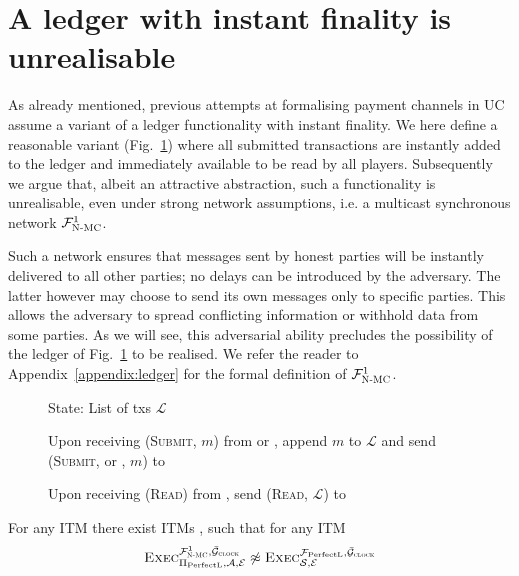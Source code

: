 \section{A ledger with instant finality is unrealisable}
\label{sec:perfect-ledger}
  As already mentioned, previous attempts at formalising payment channels in
  UC~\cite{DBLP:conf/ccs/DziembowskiFH18,perun,Malavolta:2017:CPP:3133956.3134096,sprites}
  assume a variant of a ledger functionality with instant finality. We here
  define a reasonable variant \perfectledger{}
  (Fig.~\ref{fig:perfectledger:func}) where all submitted transactions are
  instantly added to the ledger and immediately available to be read by all
  players. Subsequently we argue that, albeit an attractive abstraction, such a
  functionality is unrealisable, even under strong network assumptions, i.e. a
  multicast synchronous network $\mathcal{F}_{\textsc{N-MC}}^1$.

  Such a network ensures that messages sent by honest parties will be instantly
  delivered to all other parties; no delays can be introduced by the adversary.
  The latter however may choose to send its own messages only to specific
  parties. This allows the adversary to spread conflicting information or
  withhold data from some parties. As we will see, this adversarial ability
  precludes the possibility of the ledger of Fig.~\ref{fig:perfectledger:func}
  to be realised. We refer the reader to Appendix~\ref{appendix:ledger} for the
  formal definition of $\mathcal{F}_{\textsc{N-MC}}^1$.

  \begin{figure}[H]
    \begin{systembox}{\perfectledger}
      \begin{algorithmic}[1]
        \State State: List of txs $\mathcal{L}$
        \Statex

        \State Upon receiving (\textsc{Submit}, $m$) from \alice or \adversary,
        append $m$ to $\mathcal{L}$ and send (\textsc{Submit}, \alice or
        \adversary, $m$) to \adversary
        \Statex

        \State Upon receiving (\textsc{Read}) from \alice, send (\textsc{Read},
        $\mathcal{L}$) to \alice
      \end{algorithmic}
    \end{systembox}
    \caption{}
    \label{fig:perfectledger:func}
  \end{figure}

  \begin{theorem}
    \label{theorem:perfectledger}
    For any ITM \perfectprot{} there exist ITMs \perfectenv,
    \perfectadv{} such that for any ITM \simulator
    \begin{equation*}
      \textsc{Exec}^{\mathcal{F}_{\textsc{N-MC}}^1, \bar{\mathcal{G}}_{\textsc{clock}}}_{\Pi_{\mathrm{PerfectL}}, \mathcal{A},
      \mathcal{E}} \not\approx \textsc{Exec}^{\mathcal{F}_{\mathrm{PerfectL}},
      \bar{\mathcal{G}}_{\textsc{clock}}}_{\mathcal{S}, \mathcal{E}}
    \end{equation*}
  \end{theorem}


